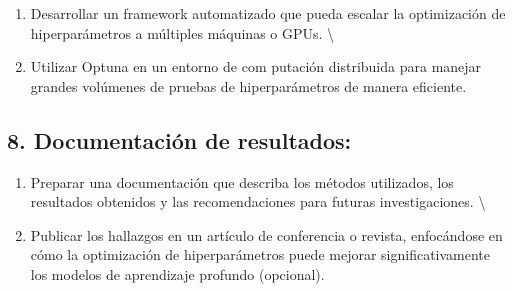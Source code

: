 \documentclass[11pt]{article}
\providecommand{\tightlist}{%
      \setlength{\itemsep}{0pt}\setlength{\parskip}{0pt}}
\begin{document}
    \begin{enumerate}
\def\labelenumi{\alph{enumi}.}
\tightlist
\item
  Desarrollar un framework automatizado que pueda escalar la
  optimización de hiperparámetros a múltiples máquinas o GPUs.
  \textbackslash{}
\item
  Utilizar Optuna en un entorno de com putación distribuida para manejar
  grandes volúmenes de pruebas de hiperparámetros de manera eficiente.
\end{enumerate}

    \hypertarget{documentaciuxf3n-de-resultados}{%
\subsection{8. Documentación de
resultados:}\label{documentaciuxf3n-de-resultados}}

    \begin{enumerate}
\def\labelenumi{\alph{enumi}.}
\tightlist
\item
  Preparar una documentación que describa los métodos utilizados, los
  resultados obtenidos y las recomendaciones para futuras
  investigaciones. \textbackslash{}
\item
  Publicar los hallazgos en un artículo de conferencia o revista,
  enfocándose en cómo la optimización de hiperparámetros puede mejorar
  significativamente los modelos de aprendizaje profundo (opcional).
\end{enumerate}


    
    
    
\end{document}
